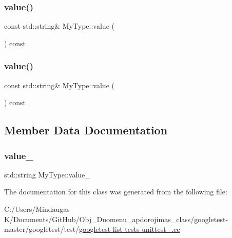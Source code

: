 \mbox{\label{class_my_type_a04eaace57f0ecd8ee8898defbdee31b4}} 
\subsubsection{\texorpdfstring{value()}{value()}\hspace{0.1cm}{\footnotesize\ttfamily [2/3]}}
{\footnotesize\ttfamily const std\+::string\& My\+Type\+::value (\begin{DoxyParamCaption}{ }\end{DoxyParamCaption}) const\hspace{0.3cm}{\ttfamily [inline]}}

\mbox{\label{class_my_type_a04eaace57f0ecd8ee8898defbdee31b4}} 
\subsubsection{\texorpdfstring{value()}{value()}\hspace{0.1cm}{\footnotesize\ttfamily [3/3]}}
{\footnotesize\ttfamily const std\+::string\& My\+Type\+::value (\begin{DoxyParamCaption}{ }\end{DoxyParamCaption}) const\hspace{0.3cm}{\ttfamily [inline]}}



\subsection{Member Data Documentation}
\mbox{\label{class_my_type_ae294bc35031fef7015a1b135deeedd22}} 
\subsubsection{\texorpdfstring{value\_}{value\_}}
{\footnotesize\ttfamily std\+::string My\+Type\+::value\+\_\+\hspace{0.3cm}{\ttfamily [private]}}



The documentation for this class was generated from the following file\+:\begin{DoxyCompactItemize}
\item 
C\+:/\+Users/\+Mindaugas K/\+Documents/\+Git\+Hub/\+Obj\+\_\+\+Duomenu\+\_\+apdorojimas\+\_\+class/googletest-\/master/googletest/test/\mbox{\hyperlink{googletest-master_2googletest_2test_2googletest-list-tests-unittest___8cc}{googletest-\/list-\/tests-\/unittest\+\_\+.\+cc}}\end{DoxyCompactItemize}
